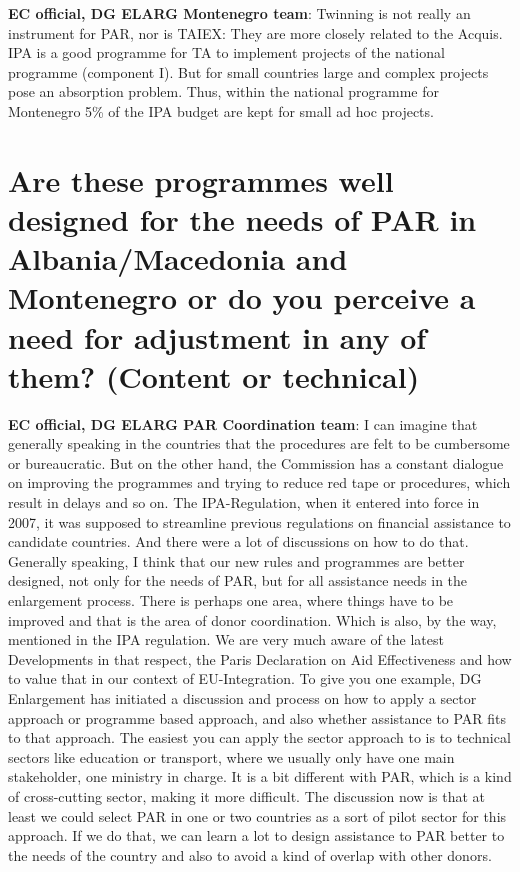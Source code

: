 \textbf{EC official, DG ELARG Montenegro team}: Twinning is not really an instrument for PAR, nor is TAIEX: They are more closely related to the Acquis. IPA is a good programme for TA to implement projects of the national programme (component I). But for small countries large and complex projects pose an absorption problem. Thus, within the national programme for Montenegro 5\% of the IPA budget are kept for small ad hoc projects.\\
\section{Are these programmes well designed for the needs of PAR in Albania/Macedonia and Montenegro or do you perceive a need for adjustment in any of them? (Content or technical) }
\label{sec:technical}
\textbf{EC official, DG ELARG PAR Coordination team}: I can imagine that generally speaking in the countries that the procedures are felt to be cumbersome or bureaucratic. But on the other hand, the Commission has a constant dialogue on improving the programmes and trying to reduce red tape or procedures, which result in delays and so on. The IPA-Regulation, when it entered into force in 2007, it was supposed to streamline previous regulations on financial assistance to candidate countries. And there were a lot of discussions on how to do that. Generally speaking, I think that our new rules and programmes are better designed, not only for the needs of PAR, but for all assistance needs in the enlargement process. There is perhaps one area, where things have to be improved and that is the area of donor coordination. Which is also, by the way, mentioned in the IPA regulation. We are very much aware of the latest Developments in that respect, the Paris Declaration on Aid Effectiveness and how to value that in our context of EU-Integration. To give you one example, DG Enlargement has initiated a discussion and process on how to apply a sector approach or programme based approach, and also whether assistance to PAR fits to that approach. The easiest you can apply the sector approach to is to technical sectors like education or transport, where we usually only have one main stakeholder, one ministry in charge. It is a bit different with PAR, which is a kind of cross-cutting sector, making it more difficult. The discussion now is that at least we could select PAR in one or two countries as a sort of pilot sector for this approach. If we do that, we can learn a lot to design assistance to PAR better to the needs of the country and also to avoid a kind of overlap with other donors. \\

